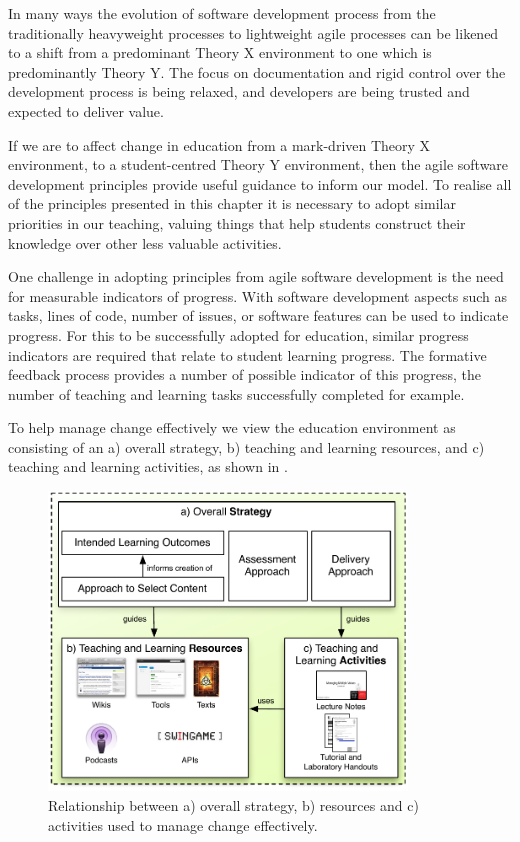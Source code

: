 In many ways the evolution of software development process from the traditionally heavyweight processes to lightweight agile processes can be likened to a shift from a predominant Theory X environment to one which is predominantly Theory Y. The focus on documentation and rigid control over the development process is being relaxed, and developers are being trusted and expected to deliver value. 

If we are to affect change in education from a mark-driven Theory X environment, to a student-centred Theory Y environment, then the agile software development principles provide useful guidance to inform our model. To realise all of the principles presented in this chapter it is necessary to adopt similar priorities in our teaching, valuing things that help students construct their knowledge over other less valuable activities.

One challenge in adopting principles from agile software development is the need for measurable indicators of progress. With software development aspects such as tasks, lines of code, number of issues, or software features can be used to indicate progress. For this to be successfully adopted for education, similar progress indicators are required that relate to student learning progress. The formative feedback process provides a number of possible indicator of this progress, the number of teaching and learning tasks successfully completed for example. 

To help manage change effectively we view the education environment as consisting of an a) overall strategy, b) teaching and learning resources, and c) teaching and learning activities, as shown in . 

\begin{figure}[htbp]
	\centering
	\includegraphics[width=0.85\textwidth]{StrategyResourcesActivities}
	\caption{Relationship between a) overall strategy, b) resources and c) activities used to manage change effectively.}
	\label{fig:strategy}
\end{figure}


